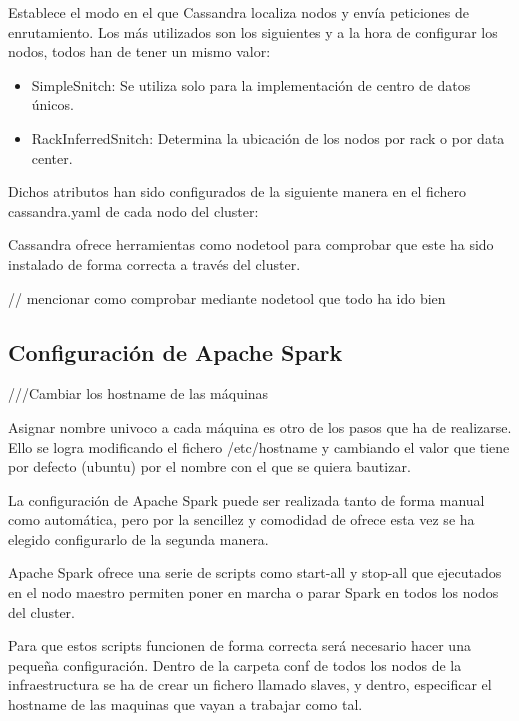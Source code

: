 
Establece el modo en el que Cassandra localiza nodos y envía peticiones de enrutamiento. Los más utilizados son los siguientes y a la hora de configurar los nodos, todos han de tener un mismo valor:

\begin{itemize}
	\item SimpleSnitch: Se utiliza solo para la implementación de centro de datos únicos.
	\item RackInferredSnitch: Determina la ubicación de los nodos por rack o por data center.
\end{itemize}
	 
Dichos atributos han sido configurados de la siguiente manera en el fichero cassandra.yaml de cada nodo del cluster: 




Cassandra ofrece herramientas como nodetool para comprobar que este ha sido instalado de forma correcta a través del cluster.

// mencionar como comprobar mediante nodetool que todo ha ido bien


\subsection{Configuración de Apache Spark}

///Cambiar los hostname de las máquinas

Asignar nombre univoco a cada máquina es otro de los pasos que ha de realizarse. Ello se logra modificando el fichero /etc/hostname y cambiando el valor que tiene por defecto (ubuntu) por el nombre con el que se quiera bautizar.

La configuración de Apache Spark puede ser realizada tanto de forma manual como automática, pero por la sencillez y comodidad de ofrece esta vez se ha elegido configurarlo de la segunda manera.

Apache Spark ofrece una serie de scripts como start-all y stop-all que ejecutados en el nodo maestro permiten poner en marcha o parar Spark en todos los nodos del cluster.

Para que estos scripts funcionen de forma correcta será necesario hacer una pequeña configuración. Dentro de la carpeta conf de todos los nodos de la infraestructura se ha de crear un fichero llamado slaves, y dentro, especificar el hostname de las maquinas que vayan a trabajar como tal.


